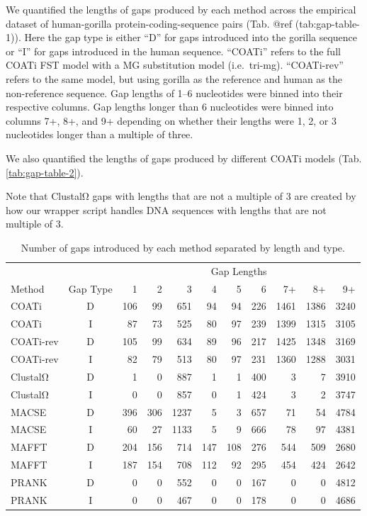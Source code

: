 \documentclass[
]{article}
\begin{document}
We quantified the lengths of gaps produced by each method across the empirical
dataset of human-gorilla protein-coding-sequence pairs (Tab. @ref
(tab:gap-table-1)). Here the gap type is either ``D'' for gaps introduced into
the gorilla sequence or ``I'' for gaps introduced in the human sequence. ``COATi''
refers to the full COATi FST model with a MG substitution model
(i.e.~tri-mg). ``COATi-rev'' refers to the same model, but using gorilla as the
reference and human as the non-reference sequence. Gap lengths of 1--6
nucleotides were binned into their respective columns. Gap lengths longer than
6 nucleotides were binned into columns 7+, 8+, and 9+ depending on whether
their lengths were 1, 2, or 3 nucleotides longer than a multiple of three.

We also quantified the lengths of gaps produced by different COATi models
(Tab. \ref{tab:gap-table-2}).

Note that ClustalΩ gaps with lengths that are not a multiple of 3 are created by
how our wrapper script handles DNA sequences with lengths that are not multiple
of 3.

\begin{table}[H]
\centering
\caption{\label{tab:gap-table-1}Number of gaps introduced by each method separated by length and type.}
\centering
\begin{tabular}[t]{lcrrrrrrrrr}
\toprule
\multicolumn{2}{c}{ } & \multicolumn{9}{c}{Gap Lengths} \\
\cmidrule(l{3pt}r{3pt}){3-11}
Method & Gap Type & 1 & 2 & 3 & 4 & 5 & 6 & 7+ & 8+ & 9+\\
\midrule
COATi & D & 106 & 99 & 651 & 94 & 94 & 226 & 1461 & 1386 & 3240\\
COATi & I & 87 & 73 & 525 & 80 & 97 & 239 & 1399 & 1315 & 3105\\
\addlinespace
COATi-rev & D & 105 & 99 & 634 & 89 & 96 & 217 & 1425 & 1348 & 3169\\
COATi-rev & I & 82 & 79 & 513 & 80 & 97 & 231 & 1360 & 1288 & 3031\\
\addlinespace
ClustalΩ & D & 1 & 0 & 887 & 1 & 1 & 400 & 3 & 7 & 3910\\
ClustalΩ & I & 0 & 0 & 857 & 0 & 1 & 424 & 3 & 2 & 3747\\
\addlinespace
MACSE & D & 396 & 306 & 1237 & 5 & 3 & 657 & 71 & 54 & 4784\\
MACSE & I & 60 & 27 & 1133 & 5 & 9 & 666 & 78 & 97 & 4381\\
\addlinespace
MAFFT & D & 204 & 156 & 714 & 147 & 108 & 276 & 544 & 509 & 2680\\
MAFFT & I & 187 & 154 & 708 & 112 & 92 & 295 & 454 & 424 & 2642\\
\addlinespace
PRANK & D & 0 & 0 & 552 & 0 & 0 & 167 & 0 & 0 & 4812\\
PRANK & I & 0 & 0 & 467 & 0 & 0 & 178 & 0 & 0 & 4686\\
\bottomrule
\end{tabular}
\end{table}
\end{document}
